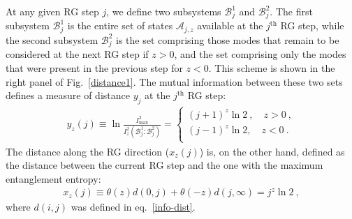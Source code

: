 At any given RG step \(j\), we define two subsystems \(\mathcal{B}_j^1\) and \(\mathcal{B}_j^2\).
The first subsystem \(\mathcal{B}_j^1\) is the entire set of states \(\mathcal{A}_{j,z}\) available at the \(j^\text{th}\) RG step, while the second subsystem \(\mathcal{B}_j^2\) is the set comprising those modes that remain to be considered at the next RG step if \(z>0\), and the set comprising only the modes that were present in the previous step for \(z<0\). This scheme is shown in the right panel of Fig.~\ref{distance1}. The mutual information between these two sets defines a measure of distance \(y_j\) at the $j^{\text{th}}$ RG step:
\begin{equation}\begin{aligned}
	y_z(j) \equiv \ln \frac{I^2_\text{max}}{I^2_z(\mathcal{B}^1_j: \mathcal{B}^2_j)} = \begin{cases}
		\left(j+1\right)^z \ln 2~, \quad  z > 0~,\\
		\left(j-1\right)^z \ln 2, \quad  z < 0~.\\
	\end{cases}
	\label{info-dist3}
\end{aligned}
\end{equation}
The distance along the RG direction ($x_z(j)$) is, on the other hand, defined as the distance between the current RG step and the one with the maximum entanglement entropy:
\begin{equation}\label{info-dist4} \begin{aligned}
	x_z(j) \equiv \theta(z) d(0,j) + \theta(-z) d(j,\infty) = j^z \ln 2~,
\end{aligned}\end{equation}
where \(d(i,j)\) was defined in eq.~\eqref{info-dist}. 

